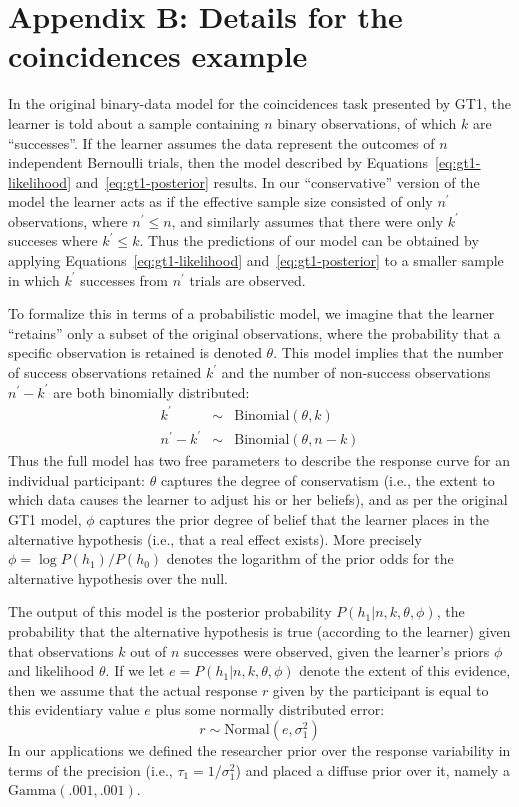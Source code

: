\documentclass[doc,floatsintext]{apa6}
\begin{document}
\section*{Appendix B: Details for the coincidences example}

In the original binary-data model for the coincidences task presented by GT1, the learner is told about a sample containing $n$ binary observations, of which $k$ are ``successes''. If the learner assumes the data represent the outcomes of $n$ independent Bernoulli trials, then the model described by Equations~\ref{eq:gt1-likelihood} and~\ref{eq:gt1-posterior} results. In our ``conservative'' version of the model the learner acts as if the effective sample size consisted of only $n^\prime$ observations, where $n^\prime \leq n$, and similarly assumes that there were only $k^\prime$ succeses where $k^\prime \leq k$. Thus the predictions of our model can be obtained by applying Equations~\ref{eq:gt1-likelihood} and~\ref{eq:gt1-posterior} to a smaller sample in which $k^\prime$ successes from $n^\prime$ trials are observed.

To formalize this in terms of a probabilistic model, we imagine that the learner ``retains'' only a subset of the original observations, where the probability that a specific observation is retained is denoted $\theta$. This model implies that the number of success observations retained $k^\prime$ and the number of non-success observations $n^\prime - k^\prime$ are both binomially distributed:
\begin{equation}
\begin{array}{rcl}
k^\prime & \sim & \mbox{Binomial}(\theta,k) \\
n^\prime - k^\prime &\sim& \mbox{Binomial}(\theta,n-k)
\end{array}
\end{equation}
Thus the full model has two free parameters to describe the response curve for an individual participant: $\theta$ captures the degree of conservatism (i.e., the extent to which data causes the learner to adjust his or her beliefs), and as per the original GT1 model, $\phi$ captures the prior degree of belief that the learner places in the alternative hypothesis (i.e., that a real effect exists). More precisely $\phi = \log P(h_1)/P(h_0)$ denotes the logarithm of the prior odds for the alternative hypothesis over the null.

The output of this model is the posterior probability $P(h_1 | n, k, \theta, \phi)$, the probability that the alternative hypothesis is true (according to the learner) given that observations $k$ out of $n$ successes were observed, given the learner's priors $\phi$ and likelihood $\theta$. If we let $e = P(h_1 | n, k, \theta, \phi)$ denote the extent of this evidence, then we assume that the actual response $r$ given by the participant is equal to this evidentiary value $e$ plus some normally distributed error:
\begin{equation}
r \sim \mbox{Normal}(e,\sigma_1^2)
\end{equation}
In our applications we defined the researcher prior over the response variability in terms of the precision (i.e., $\tau_1=1/\sigma_1^2$) and placed a diffuse prior over it, namely a $\mbox{Gamma}(.001,.001)$.
\end{document}
